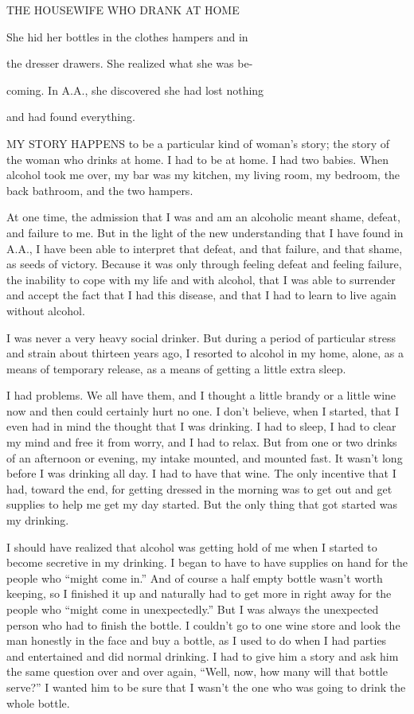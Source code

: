 
 THE HOUSEWIFE WHO DRANK AT HOME

She hid her bottles in the clothes hampers and in

the dresser drawers. She realized what she was be-

coming. In A.A., she discovered she had lost nothing

and had found everything.

       MY STORY HAPPENS to be a particular kind of woman’s story; the story of the woman who drinks at home. I had to be at home. I had two babies. When alcohol took me over, my bar was my kitchen, my living room, my bedroom, the back bathroom, and the two hampers.

At one time, the admission that I was and am an alcoholic meant shame, defeat, and failure to me. But in the light of the new understanding that I have found in A.A., I have been able to interpret that defeat, and that failure, and that shame, as seeds of victory. Because it was only through feeling defeat and feeling failure, the inability to cope with my life and with alcohol, that I was able to surrender and accept the fact that I had this disease, and that I had to learn to live again without alcohol.

I was never a very heavy social drinker. But during a period of particular stress and strain about thirteen years ago, I resorted to alcohol in my home, alone, as a means of temporary release, as a means of getting a little extra sleep.

       I had problems. We all have them, and I thought a little brandy or a little wine now and then could certainly hurt no one. I don’t believe, when I started, that I even had in mind the thought that I was drinking. I had to sleep, I had to clear my mind and free it from worry, and I had to relax. But from one or two drinks of an afternoon or evening, my intake mounted, and mounted fast. It wasn’t long before I was drinking all day. I had to have that wine. The only incentive that I had, toward the end, for getting dressed in the morning was to get out and get supplies to help me get my day started. But the only thing that got started was my drinking.

I should have realized that alcohol was getting hold of me when I started to become secretive in my drinking. I began to have to have supplies on hand for the people who “might come in.” And of course a half empty bottle wasn’t worth keeping, so I finished it up and naturally had to get more in right away for the people who “might come in unexpectedly.” But I was always the unexpected person who had to finish the bottle. I couldn’t go to one wine store and look the man honestly in the face and buy a bottle, as I used to do when I had parties and entertained and did normal drinking. I had to give him a story and ask him the same question over and over again, “Well, now, how many will that bottle serve?” I wanted him to be sure that I wasn’t the one who was going to drink the whole bottle.

